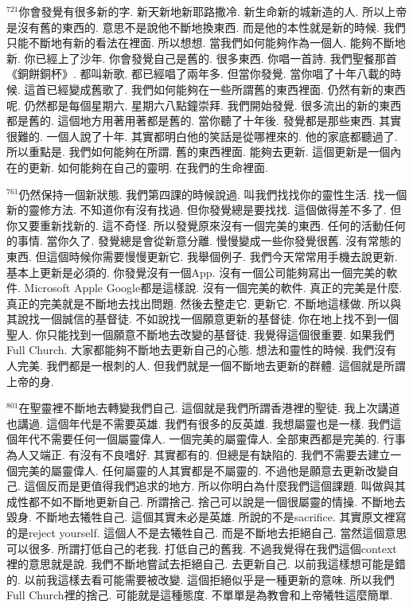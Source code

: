 \documentclass{book}
\begin{document}
$^{721}$你會發覺有很多新的字.
新天新地新耶路撒冷.
新生命新的城新造的人.
所以上帝是沒有舊的東西的.
意思不是說他不斷地換東西.
而是他的本性就是新的時候.
我們只能不斷地有新的看法在裡面.
所以想想.
當我們如何能夠作為一個人.
能夠不斷地新.
你已經上了沙年.
你會發覺自己是舊的.
很多東西.
你唱一首詩.
我們聖餐那首《銅餅銅杯》.
都叫新歌.
都已經唱了兩年多.
但當你發覺.
當你唱了十年八載的時候.
這首已經變成舊歌了.
我們如何能夠在一些所謂舊的東西裡面.
仍然有新的東西呢.
仍然都是每個星期六.
星期六八點鐘崇拜.
我們開始發覺.
很多流出的新的東西都是舊的.
這個地方用著用著都是舊的.
當你聽了十年後.
發覺都是那些東西.
其實很難的.
一個人說了十年.
其實都明白他的笑話是從哪裡來的.
他的家底都聽過了.
所以重點是.
我們如何能夠在所謂.
舊的東西裡面.
能夠去更新.
這個更新是一個內在的更新.
如何能夠在自己的靈明.
在我們的生命裡面.

$^{761}$仍然保持一個新狀態.
我們第四課的時候說過.
叫我們找找你的靈性生活.
找一個新的靈修方法.
不知道你有沒有找過.
但你發覺總是要找找.
這個做得差不多了.
但你又要重新找新的.
這不奇怪.
所以發覺原來沒有一個完美的東西.
任何的活動任何的事情.
當你久了.
發覺總是會從新意分離.
慢慢變成一些你發覺很舊.
沒有常態的東西.
但這個時候你需要慢慢更新它.
我舉個例子.
我們今天常常用手機去說更新.
基本上更新是必須的.
你發覺沒有一個App.
沒有一個公司能夠寫出一個完美的軟件.
Microsoft Apple Google都是這樣說.
沒有一個完美的軟件.
真正的完美是什麼.
真正的完美就是不斷地去找出問題.
然後去整走它.
更新它.
不斷地這樣做.
所以與其說找一個誠信的基督徒.
不如說找一個願意更新的基督徒.
你在地上找不到一個聖人.
你只能找到一個願意不斷地去改變的基督徒.
我覺得這個很重要.
如果我們Full Church.
大家都能夠不斷地去更新自己的心態.
想法和靈性的時候.
我們沒有人完美.
我們都是一根刺的人.
但我們就是一個不斷地去更新的群體.
這個就是所謂上帝的身.

$^{801}$在聖靈裡不斷地去轉變我們自己.
這個就是我們所謂香港裡的聖徒.
我上次講道也講過.
這個年代是不需要英雄.
我們有很多的反英雄.
我想屬靈也是一樣.
我們這個年代不需要任何一個屬靈偉人.
一個完美的屬靈偉人.
全部東西都是完美的.
行事為人又端正.
有沒有不良嗜好.
其實都有的.
但總是有缺陷的.
我們不需要去建立一個完美的屬靈偉人.
任何屬靈的人其實都是不屬靈的.
不過他是願意去更新改變自己.
這個反而是更值得我們追求的地方.
所以你明白為什麼我們這個課題.
叫做與其成性都不如不斷地更新自己.
所謂捨己.
捨己可以說是一個很屬靈的情操.
不斷地去毀身.
不斷地去犧牲自己.
這個其實未必是英雄.
所說的不是sacrifice.
其實原文裡寫的是reject yourself.
這個人不是去犧牲自己.
而是不斷地去拒絕自己.
當然這個意思可以很多.
所謂打低自己的老我.
打低自己的舊我.
不過我覺得在我們這個context裡的意思就是說.
我們不斷地嘗試去拒絕自己.
去更新自己.
以前我這樣想可能是錯的.
以前我這樣去看可能需要被改變.
這個拒絕似乎是一種更新的意味.
所以我們Full Church裡的捨己.
可能就是這種態度.
不單單是為教會和上帝犧牲這麼簡單.
\end{document}
